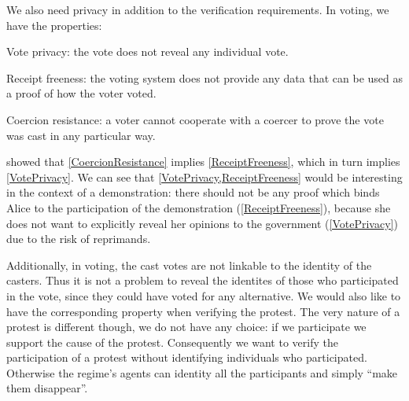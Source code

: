 We also need privacy in addition to the verification requirements.
In voting, we have the properties:
\begin{requirements}[P]
\item\label{VotePrivacy} Vote privacy: the vote does not reveal any individual 
  vote.
\item\label{ReceiptFreeness} Receipt freeness: the voting system does not 
  provide any data that can be used as a proof of how the voter voted.
\item\label{CoercionResistance} Coercion resistance: a voter cannot cooperate 
  with a coercer to prove the vote was cast in any particular way.
\end{requirements}
\Textcite{VerifyingPrivacyPropertiesOfVotingProtocols} showed that 
\cref{CoercionResistance} implies \cref{ReceiptFreeness}, which in turn implies
\cref{VotePrivacy}.
We can see that \cref{VotePrivacy,ReceiptFreeness} would be interesting in the 
context of a demonstration: there should not be any proof which binds Alice to 
the participation of the demonstration (\cref{ReceiptFreeness}), because she 
does not want to explicitly reveal her opinions to the government 
(\cref{VotePrivacy}) due to the risk of reprimands.

Additionally, in voting, the cast votes are not linkable to the identity of the 
casters.
Thus it is not a problem to reveal the identites of those who participated in 
the vote, since they could have voted for any alternative.
We would also like to have the corresponding property when verifying the 
protest.
The very nature of a protest is different though, we do not have any choice: if 
we participate we support the cause of the protest.
Consequently we want to verify the participation of a protest without 
identifying individuals who participated.
Otherwise the regime's agents can identity all the participants and simply 
\enquote{make them disappear}. %

